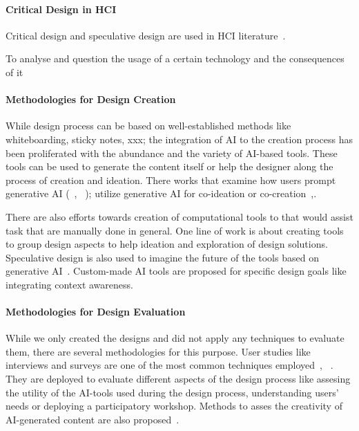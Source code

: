 \paragraph{Critical Design in HCI}

Critical design and speculative design are used in HCI literature~\cite{bardzell_what_2013}. 

To analyse and question the usage of a certain technology and the consequences of it~\cite{lawson_problematising_2015}

\paragraph{Methodologies for Design Creation} 
While design process can be based on well-established methods like whiteboarding, sticky notes, xxx; the integration of AI to the creation process has been proliferated with the abundance and the variety of AI-based tools. These tools can be used to generate the content itself or help the designer along the process of creation and ideation. There works that examine how users prompt generative AI (~\cite{sanchez_examining_2023}, ~\cite{chang_prompt_2023}); utilize generative AI for co-ideation or co-creation~\cite{tholander_design_2023},\cite{chiou_designing_2023}.

There are also efforts towards creation of computational tools to that would assist task that are manually done in general. One line of work is about creating tools to group design aspects to help ideation and exploration of design solutions\cite{huang_designnet_2023}. Speculative design is also used to imagine the future of the tools based on generative AI~\cite{lin_generative_2023}. Custom-made AI tools are proposed for specific design goals like integrating context awareness\cite{fan_contextcam_2024}.

\paragraph{Methodologies for Design Evaluation} 
While we only created the designs and did not apply any techniques to evaluate them, there are several methodologies for this purpose. User studies like interviews and surveys are one of the most common techniques employed~\cite{sanchez_examining_2023}, ~\cite{chang_prompt_2023}. They are deployed to evaluate different aspects of the design process like assesing the utility of the AI-tools used during the design process, understanding users' needs or deploying a participatory workshop. Methods to asses the creativity of AI-generated content are also proposed~\cite{chakrabarty_art_2024}.

